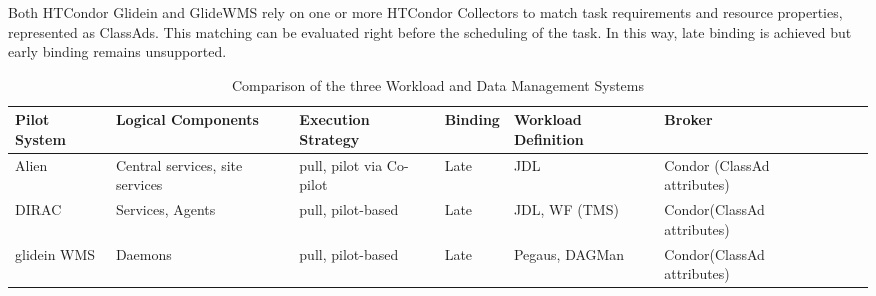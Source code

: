 Both HTCondor Glidein and GlideWMS rely on one or more HTCondor Collectors to match task requirements and resource properties, represented as ClassAds. This matching can be evaluated right before the scheduling of the task. In this way, late binding is achieved but early binding remains unsupported.
\begin{table*}
\begin{center}
\begin{tabular}{llllllll}
  \hline
Pilot System  &Logical Components& Execution Strategy & Binding  & Workload Definition  &  Broker  & \\
\hline
Alien & Central services, site services & pull, pilot via Co-pilot & Late & JDL & Condor (ClassAd attributes) &\\
DIRAC & Services, Agents& pull, pilot-based & Late & JDL, WF (TMS) & Condor(ClassAd attributes) &\\
glidein WMS& Daemons & pull, pilot-based  & Late & Pegaus, DAGMan & Condor(ClassAd attributes) &\\
\hline
\end{tabular}
\end{center}
\caption{Comparison of the three Workload and Data Management Systems}\label{tab:Summary}
\end{table*}
	
